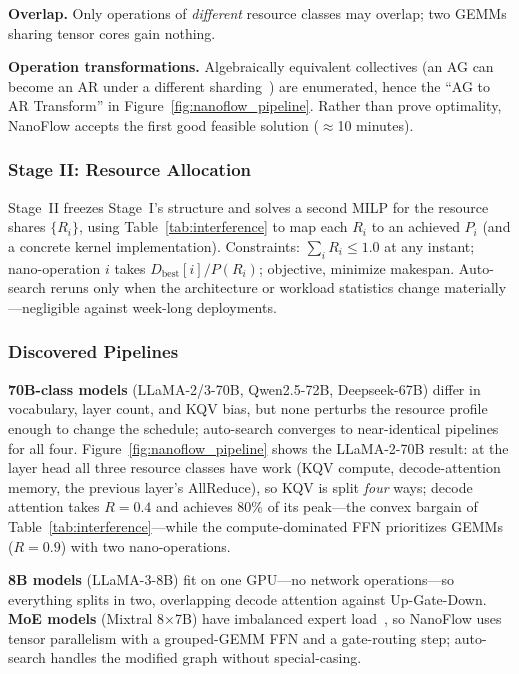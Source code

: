 \documentclass[manuscript,review]{acmart}
\newcommand{\nf}{NanoFlow\xspace}   %
\begin{document}
\textbf{Overlap.} Only operations of \emph{different} resource classes may overlap; two GEMMs sharing tensor cores 
gain nothing.

\textbf{Operation transformations.} Algebraically equivalent collectives (an AG can become an AR under a different 
sharding~\cite{shoeybi2020megatron_b, zheng2022alpa}) are enumerated, hence the ``AG to AR Transform'' in 
Figure~\ref{fig:nanoflow_pipeline}.
Rather than prove optimality, \nf accepts the first good feasible solution
($\approx$10 minutes).

\subsubsection{Stage II: Resource Allocation}

Stage~II freezes Stage~I's structure and solves a second MILP for the resource shares $\{R_i\}$, using 
Table~\ref{tab:interference} to map each $R_i$ to an achieved $P_i$ (and a concrete kernel implementation). 
Constraints: $\sum_i R_i \le 1.0$ at any instant; nano-operation $i$ takes $D_{\mathrm{best}}[i]/P(R_i)$; objective, 
minimize makespan. Auto-search reruns only when the architecture or workload statistics change 
materially---negligible against week-long deployments.

\subsubsection{Discovered Pipelines}

\textbf{70B-class models} (LLaMA-2/3-70B, Qwen2.5-72B, Deepseek-67B) differ in vocabulary, layer count, and 
KQV bias, but none perturbs the resource profile enough to change the schedule; auto-search converges to 
near-identical pipelines for all four. Figure~\ref{fig:nanoflow_pipeline} shows the LLaMA-2-70B result: at 
the layer head all three resource classes have work (KQV compute, decode-attention memory, the previous 
layer's AllReduce), so KQV is split \emph{four} ways; decode attention takes $R = 0.4$ and achieves 80\% of 
its peak---the convex bargain of Table~\ref{tab:interference}---while the compute-dominated FFN prioritizes 
GEMMs ($R = 0.9$) with two nano-operations.

\textbf{8B models} (LLaMA-3-8B) fit on one GPU---no network operations---so everything splits in two, 
overlapping decode attention against Up-Gate-Down. \textbf{MoE models} (Mixtral 8$\times$7B) have imbalanced 
expert load~\cite{jiang2023mistral}, so \nf uses tensor parallelism with a grouped-GEMM FFN and a gate-routing 
step; auto-search handles the modified graph without special-casing.
\end{document}
